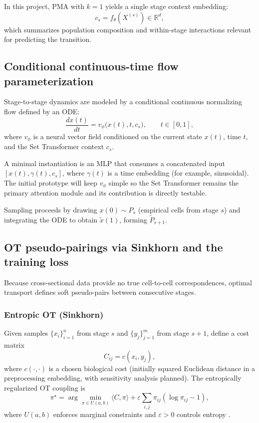\documentclass[conference]{IEEEtran}
\newcommand{\R}{\mathbb{R}}
\begin{document}
In this project, PMA with $k=1$ yields a single stage context embedding:
\[
c_s = f_{\theta}(X^{(s)}) \in \R^d,
\]
which summarizes population composition and within-stage interactions relevant for predicting the transition.

\subsection{Conditional continuous-time flow parameterization}

Stage-to-stage dynamics are modeled by a conditional continuous normalizing flow defined by an ODE:
\[
\frac{d x(t)}{dt} = v_{\phi}\!\big(x(t), t, c_s\big), \qquad t \in [0,1],
\]
where $v_{\phi}$ is a neural vector field conditioned on the current state $x(t)$, time $t$, and the Set Transformer context $c_s$.

A minimal instantiation is an MLP that consumes a concatenated input $[x(t), \gamma(t), c_s]$, where $\gamma(t)$ is a time embedding (for example, sinusoidal). The initial prototype will keep $v_{\phi}$ simple so the Set Transformer remains the primary attention module and its contribution is directly testable.

Sampling proceeds by drawing $x(0) \sim P_s$ (empirical cells from stage $s$) and integrating the ODE to obtain $\tilde{x}(1)$, forming $\tilde{P}_{s+1}$.

\subsection{OT pseudo-pairings via Sinkhorn and the training loss}

Because cross-sectional data provide no true cell-to-cell correspondences, optimal transport defines soft pseudo-pairs between consecutive stages.

\subsubsection{Entropic OT (Sinkhorn)}
Given samples $\{x_i\}_{i=1}^{n}$ from stage $s$ and $\{y_j\}_{j=1}^{m}$ from stage $s+1$, define a cost matrix
\[
C_{ij} = c(x_i, y_j),
\]
where $c(\cdot,\cdot)$ is a chosen biological cost (initially squared Euclidean distance in a preprocessing embedding, with sensitivity analysis planned). The entropically regularized OT coupling is
\[
\pi^\star
=
\arg\min_{\pi \in U(a,b)}
\langle C,\pi\rangle
+
\varepsilon \sum_{i,j}\pi_{ij}(\log \pi_{ij}-1),
\]
where $U(a,b)$ enforces marginal constraints and $\varepsilon>0$ controls entropy \cite{Cuturi2013-li,Bunne2024-pl}.
\end{document}
